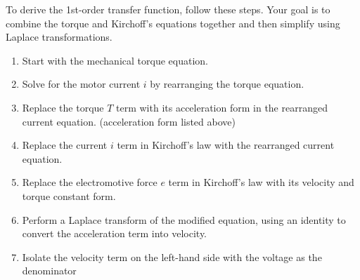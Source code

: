 \documentclass[11pt,fleqn]{book} %
\begin{document}
To derive the 1st-order transfer function, follow these steps. Your goal is to combine the torque and Kirchoff's equations together and then simplify using Laplace transformations. 
\begin{enumerate}
    \item Start with the mechanical torque equation. 
    \item Solve for the motor current $i$ by rearranging the torque equation. 
    \item Replace the torque $T$ term with its acceleration form in the rearranged current equation. (acceleration form listed above)  
    \item Replace the current $i$ term in Kirchoff's law with the rearranged current equation.
    \item Replace the electromotive force $e$ term in Kirchoff's law with its velocity and torque constant form. 
    \item Perform a Laplace transform of the modified equation, using an identity to convert the acceleration term into velocity. 
    \item Isolate the velocity term on the left-hand side with the voltage as the denominator
\end{enumerate}




\end{document}
